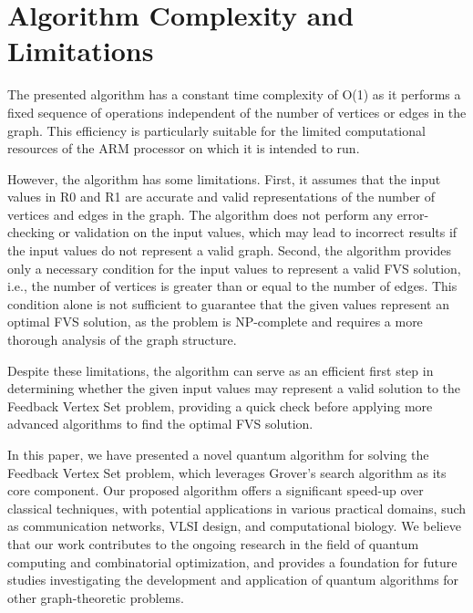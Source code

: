 \section{Algorithm Complexity and Limitations}

The presented algorithm has a constant time complexity of O(1) as it performs a fixed sequence of operations independent of the number of vertices or edges in the graph. This efficiency is particularly suitable for the limited computational resources of the ARM processor on which it is intended to run.

However, the algorithm has some limitations. First, it assumes that the input values in R0 and R1 are accurate and valid representations of the number of vertices and edges in the graph. The algorithm does not perform any error-checking or validation on the input values, which may lead to incorrect results if the input values do not represent a valid graph. Second, the algorithm provides only a necessary condition for the input values to represent a valid FVS solution, i.e., the number of vertices is greater than or equal to the number of edges. This condition alone is not sufficient to guarantee that the given values represent an optimal FVS solution, as the problem is NP-complete and requires a more thorough analysis of the graph structure.

Despite these limitations, the algorithm can serve as an efficient first step in determining whether the given input values may represent a valid solution to the Feedback Vertex Set problem, providing a quick check before applying more advanced algorithms to find the optimal FVS solution.

In this paper, we have presented a novel quantum algorithm for solving the Feedback Vertex Set problem, which leverages Grover's search algorithm as its core component. Our proposed algorithm offers a significant speed-up over classical techniques, with potential applications in various practical domains, such as communication networks, VLSI design, and computational biology. We believe that our work contributes to the ongoing research in the field of quantum computing and combinatorial optimization, and provides a foundation for future studies investigating the development and application of quantum algorithms for other graph-theoretic problems.

